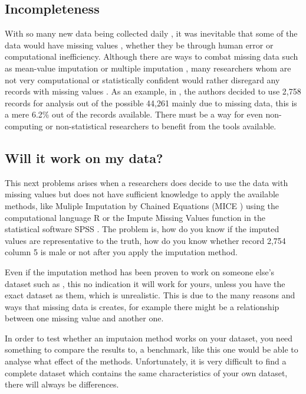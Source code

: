 \documentclass{IEEEconf}
\begin{document}
		\subsection{Incompleteness} %
		\label{sub:incompleteness}
			With so many new data being collected daily \cite{bigData}, it was inevitable that some of the data would have missing values \cite{missing1}, whether they be through human error or computational inefficiency. Although there are ways to combat missing data such as mean-value imputation or multiple imputation \cite{missing1,missing2,missing3}, many researchers whom are not very computational or statistically confident would rather disregard any records with missing values \cite{epi1,ep2,ep3,ep4,ep5}. As an example, in \cite{epi1}, the authors decided to use 2,758 records for analysis out of the possible 44,261 mainly due to missing data, this is a mere 6.2\% out of the records available. There must be a way for even non-computing or non-statistical researchers to benefit from the tools available. 
		\subsection{Will it work on my data?} %
		\label{sub:will_it_work_on_my_data_}
		This next problems arises when a researchers does decide to use the data with missing values but does not have sufficient knowledge to apply the available methods, like Muliple Imputation by Chained Equations (MICE \cite{mice}) using the computational language R \cite{r} or the Impute Missing Values function in the statistical software SPSS \cite{spss}. The problem is, how do you know if the imputed values are representative to the truth, how do you know whether record 2,754 column 5 is male or not after you apply the imputation method.

		Even if the imputation method has been proven to work on someone else's dataset such as \cite{compare}, this no indication it will work for yours, unless you have the exact dataset as them, which is unrealistic. This is due to the many reasons and ways that missing data is creates, for example there might be a relationship between one missing value and another one. 

		In order to test whether an imputaion method works on your dataset, you need something to compare the results to, a benchmark, like this one would be able to analyse what effect of the methods. Unfortunately, it is very difficult to find a complete dataset which contains the same characteristics of your own dataset, there will always be differences. 
\end{document}
